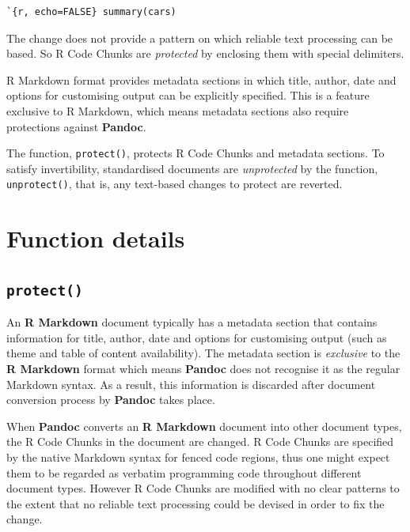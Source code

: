 \documentclass[a4paper, 12pt]{report}
\begin{document}
\begin{lstlisting}[numbers=none]
`{r, echo=FALSE} summary(cars)
\end{lstlisting}

The change does not provide a pattern on which reliable text processing can be based. So R Code Chunks are \emph{protected} by enclosing them with special delimiters.

R Markdown format provides metadata sections in which title, author, date and options for customising output can be explicitly specified. This is a feature exclusive to R Markdown, which means metadata sections also require protections against \textbf{Pandoc}.

The function, \texttt{protect()}, protects R Code Chunks and metadata sections. To satisfy invertibility, standardised documents are \emph{unprotected} by the function, \texttt{unprotect()}, that is, any text-based changes to protect are reverted.


\section{Function details}
\subsection{\texttt{protect()}}
An \textbf{R Markdown} document typically has a metadata section that contains information for title, author, date and options for customising output (such as theme and table of content availability). The metadata section is \emph{exclusive} to the \textbf{R Markdown} format which means \textbf{Pandoc} does not recognise it as the regular Markdown syntax. As a result, this information is discarded after document conversion process by \textbf{Pandoc} takes place.

When \textbf{Pandoc} converts an \textbf{R Markdown} document into other document types, the R Code Chunks in the document are changed. R Code Chunks are specified by the native Markdown syntax for fenced code regions, thus one might expect them to be regarded as verbatim programming code throughout different document types. However R Code Chunks are modified with no clear patterns to the extent that no reliable text processing could be devised in order to fix the change.
\end{document}
